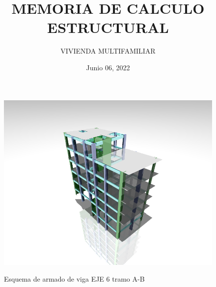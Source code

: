 \documentclass[12pt,addpoints]{article}
\title{\textbf{MEMORIA DE CALCULO ESTRUCTURAL}}
\author{VIVIENDA MULTIFAMILIAR}
\date{Junio 06, 2022}
\renewcommand{\headrulewidth}{0.4pt}
\renewcommand{\footrulewidth}{0.4pt}
\begin{document}
\maketitle
\begin{figure}[h!]
    \centering
    \includegraphics[scale=0.75]{IMAGENES/r2.png}
    \label{fig:my_label}
\end{figure}
\thispagestyle{empty}
\newpage

\clearpage                       %
{                                %
  \pagestyle{empty}              %
  {
    \fancyhf{}%
    \renewcommand{\headrulewidth}{0pt}%
    \renewcommand{\footrulewidth}{0pt}%
  }
    \begin{spacing}{1.35}
    \tableofcontents
  \end{spacing}
  \thispagestyle{empty}  
  \listoffigures
\newpage
\listoftables
  \thispagestyle{empty} 
}


\newpage








\begin{figure}[h!]
    \caption{Esquema de armado de viga EJE 6 tramo A-B}
    \centering
    
    \vspace{.5cm}
    
    \label{fig:my_label}
\end{figure}

\newpage


\newpage

\clearpage

\end{document}
